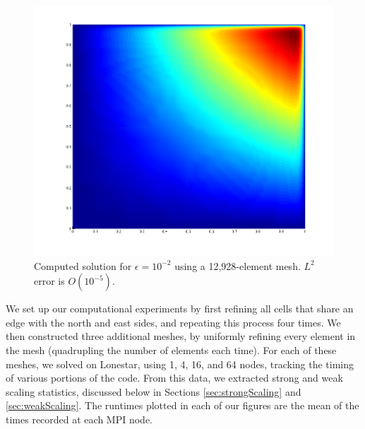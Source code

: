 \documentclass{article}
\newcommand{\oneFig}{.45}
\begin{document}
\begin{figure}[h!]
\centering
\includegraphics[scale=\oneFig]{figs/Solution12928nomesh.png}
\caption{Computed solution for $\epsilon=10^{-2}$ using a 12,928-element mesh.  $L^2$ error is $O(10^{-5})$.}
\label{fig:solutionPlot}
\end{figure}

We set up our computational experiments by first refining all cells that share an edge with the north and east sides, and repeating this process four times.   We then constructed three additional meshes, by uniformly refining every element in the mesh (quadrupling the number of elements each time).  For each of these meshes, we solved on Lonestar, using 1, 4, 16, and 64 nodes, tracking the timing of various portions of the code.  From this data, we extracted strong and weak scaling statistics, discussed below in Sections \ref{sec:strongScaling} and \ref{sec:weakScaling}.  The runtimes plotted in each of our figures are the mean of the times recorded at each MPI node.
\end{document}
